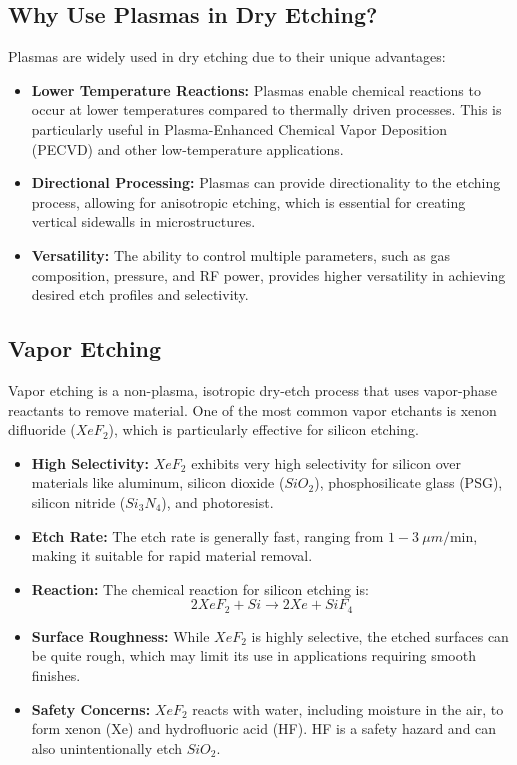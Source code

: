 \documentclass{report}
\begin{document}
\subsection{Why Use Plasmas in Dry Etching?}
Plasmas are widely used in dry etching due to their unique advantages:
\begin{itemize}
    \item \textbf{Lower Temperature Reactions:} Plasmas enable chemical reactions to occur at lower temperatures compared to thermally driven processes. This is particularly useful in Plasma-Enhanced Chemical Vapor Deposition (PECVD) and other low-temperature applications.
    \item \textbf{Directional Processing:} Plasmas can provide directionality to the etching process, allowing for anisotropic etching, which is essential for creating vertical sidewalls in microstructures.
    \item \textbf{Versatility:} The ability to control multiple parameters, such as gas composition, pressure, and RF power, provides higher versatility in achieving desired etch profiles and selectivity.
\end{itemize}

\subsection{Vapor Etching}
Vapor etching is a non-plasma, isotropic dry-etch process that uses vapor-phase reactants to remove material. One of the most common vapor etchants is xenon difluoride ($XeF_{2}$), which is particularly effective for silicon etching.

\begin{itemize}
    \item \textbf{High Selectivity:} $XeF_{2}$ exhibits very high selectivity for silicon over materials like aluminum, silicon dioxide ($SiO_{2}$), phosphosilicate glass (PSG), silicon nitride ($Si_{3}N_{4}$), and photoresist.
    \item \textbf{Etch Rate:} The etch rate is generally fast, ranging from $1-3~\mu m/\text{min}$, making it suitable for rapid material removal.
    \item \textbf{Reaction:} The chemical reaction for silicon etching is:
    $$2XeF_{2} + Si \rightarrow 2Xe + SiF_{4}$$
    \item \textbf{Surface Roughness:} While $XeF_{2}$ is highly selective, the etched surfaces can be quite rough, which may limit its use in applications requiring smooth finishes.
    \item \textbf{Safety Concerns:} $XeF_{2}$ reacts with water, including moisture in the air, to form xenon (Xe) and hydrofluoric acid (HF). HF is a safety hazard and can also unintentionally etch $SiO_{2}$.
\end{itemize}
\end{document}
